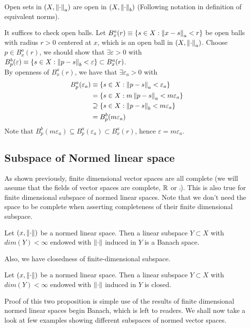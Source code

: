 \documentclass{article}
\begin{document}
\begin{proposition}\rm\nextline
	Open sets in $(X,\left\|{\cdot}\right\|_a)$ are open in $(X,\left\|{\cdot}\right\|_b)$ (Following notation in definition of equivalent norms).
	\begin{pf}{}{}
	It suffices to check open balls. Let $B^a_x(r)\equiv\{s\in X:\left\|{x-s}\right\|_a<r\}$ be open balls with radius $r>0$ centered at $x$, which is an open ball in $(X,\left\|{\cdot}\right\|_a)$. Choose $p\in B^a_x(r)$, we should show that $\exists \varepsilon>0$ with $B^b_p(\varepsilon)\equiv\{s\in X:\left\|{p-s}\right\|_b<\varepsilon\}\subset B^a_x(r)$.\\
	By openness of $B^a_x(r)$, we have that $\exists \varepsilon_a>0$ with
	\begin{equation}
		\begin{split}\nonumber
			B^a_p(\varepsilon_a)&\equiv\{s\in X:\left\|{p-s}\right\|_a<\varepsilon_a\}\\
			&=\{s\in X:m\left\|{p-s}\right\|_a<m\varepsilon_a\}\\
			&\supseteq \{s\in X:\left\|{p-s}\right\|_b<m\varepsilon_a\}\\
			&=B^b_p(m\varepsilon_a)
		\end{split}
	\end{equation}
	Note that $B^b_p(m\varepsilon_a)\subseteq B^a_p(\varepsilon_a)\subset B^a_x(r)$, hence $\varepsilon=m\varepsilon_a$.
	\end{pf}
	
\end{proposition}


\subsection{Subspace of Normed linear space}
As shown previously, finite dimensional vector spaces are all complete (we will assume that the fields of vector spaces are complete, $\mathbb{R}$ or $\comp$). This is also true for finite dimensional subspace of normed linear spaces. Note that we don't need the space to be complete when asserting completeness of their finite dimensional subspace.
\begin{proposition}
	\rm\nextline
	Let $(x,\left\|{\cdot}\right\|)$ be a normed linear space. Then a linear subspace $Y\subset X$ with $dim(Y)<\infty$ endowed with $\left\|{\cdot}\right\|$ induced in $Y$ is a Banach space.
\end{proposition}
Also, we have closedness of finite-dimensional subspace.
\begin{proposition}
	\rm\nextline
	Let $(x,\left\|{\cdot}\right\|)$ be a normed linear space. Then a linear subspace $Y\subset X$ with $dim(Y)<\infty$ endowed with $\left\|{\cdot}\right\|$ induced in $Y$ is closed.
\end{proposition}
Proof of this two proposition is simple use of the results of finite dimensional normed linear spaces begin Banach, which is left to readers. We shall now take a look at few examples showing different subspaces of normed vector spaces.
\end{document}
